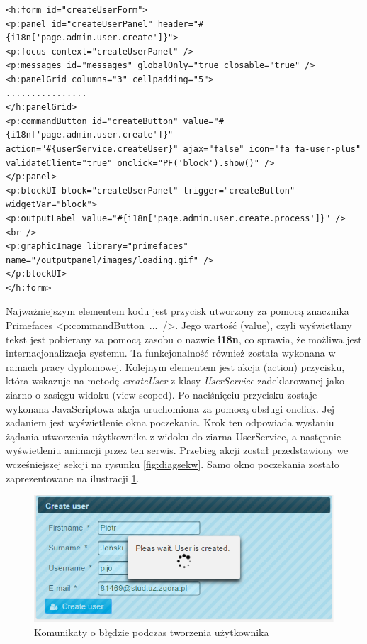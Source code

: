 \begin{lstlisting}[caption={Kod formularza tworzenia użytkownika}, label=lis:kod_form_tworzenia_uzyt, numbers=none]
<h:form id="createUserForm">
<p:panel id="createUserPanel" header="#{i18n['page.admin.user.create']}">
<p:focus context="createUserPanel" />
<p:messages id="messages" globalOnly="true closable="true" />
<h:panelGrid columns="3" cellpadding="5">
................
</h:panelGrid>
<p:commandButton id="createButton" value="#{i18n['page.admin.user.create']}"
action="#{userService.createUser}" ajax="false" icon="fa fa-user-plus"
validateClient="true" onclick="PF('block').show()" />
</p:panel>
<p:blockUI block="createUserPanel" trigger="createButton" widgetVar="block">
<p:outputLabel value="#{i18n['page.admin.user.create.process']}" />
<br />
<p:graphicImage library="primefaces" name="/outputpanel/images/loading.gif" />
</p:blockUI>
</h:form>\end{lstlisting}

Najważniejszym elementem kodu jest przycisk utworzony za pomocą znacznika Primefaces <p:commandButton~...~/>. Jego wartość (value), czyli wyświetlany tekst jest pobierany za pomocą zasobu o nazwie \textbf{i18n}, co sprawia, że możliwa jest internacjonalizacja systemu. Ta funkcjonalność również została wykonana w ramach pracy dyplomowej. Kolejnym elementem jest akcja (action) przycisku, która wskazuje na metodę \textit{createUser} z klasy \textit{UserService} zadeklarowanej jako ziarno o zasięgu widoku (view scoped). Po naciśnięciu przycisku zostaje wykonana JavaScriptowa akcja uruchomiona za pomocą obsługi onclick. Jej zadaniem jest wyświetlenie okna poczekania. Krok ten odpowiada wysłaniu żądania utworzenia użytkownika z widoku do ziarna UserService, a następnie wyświetleniu animacji przez ten serwis. Przebieg akcji został przedstawiony we wcześniejszej sekcji na rysunku \ref{fig:diagsekw}. Samo okno poczekania zostało zaprezentowane na ilustracji \ref{fig:user-czekanie}. 
\begin{figure}[h!]
	\centering
	\includegraphics[width=15cm]{rysunki/user-czekanie.png}	
	\caption{Komunikaty o błędzie podczas tworzenia użytkownika}
	\label{fig:user-czekanie}
\end{figure}

